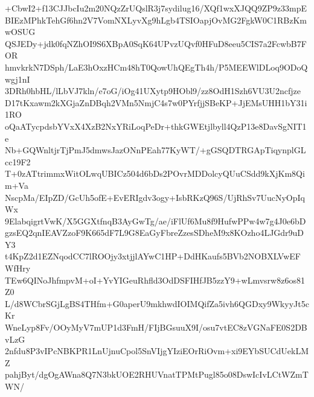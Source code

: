 +CbwI2+f13CJJbcIu2m20NQzZrUQslR3j7sydilug16/XQf1wxXJQQ9ZP9z33mpE
BIEzMPhkTehGf6hn2V7VomNXLyvXg9hLgb4TSIOapjOvMG2FgkW0C1RBzKmwOSUG
QSJEDy+jdk0fqNZhOI9S6XBpA0SqK64UPvzUQvf0HFuD8eeu5CIS7a2FcwbB7FOR
hmvkrkN7DSph/LaE3hOxzHCm48hT0QowUhQEgTh4h/P5MEEWlDLoq9ODoQwgj1nI
3DRh0hbHL/lLbVJ7kln/e7oG/iOg41UXytp9HObl9/zz8OdH1Szh6VU3U2ncfjze
D17tKxawm2kXGjaZnDBqh2VMn5NmjC4s7w0PYrfjjSBeKP+JjEMsUHH1bY31i1RO
oQaATycpdsbYVxX4XzB2NxYRiLoqPeDr+thkGWEtjlbyll4QzP13e8DavSgNIT1e
Nb+GQWnltjrTjPmJ5dmwsJazONnPEah77KyWT/+gGSQDTRGApTiqynplGLcc19F2
T+0zATtrimmxWitOLwqUBICz504d6bDs2POvrMDDolcyQUuCSdd9kXjKm8Qim+Va
NscpMa/EIpZD/GcUh5ofE+EvERIgdv3ogy+IsbRKzQ96S/UjRhSv7UucNyOpIqWx
9ElabqigrtVwK/X5GGXtfnqB3AyGwTg/ae/iFlUf6Mu8f9HufwPPw4w7g4J0e6bD
gzsEQ2qnIEAVZzoF9K665dF7L9G8EaGyFbreZzesSDheM9x8KOzho4LJGdr9uDY3
t4KpZ2d1EZNqodCC7lROOjy3xtjjlAYwC1HP+DdHKaufs5BVb2NOBXLVwEFWfHry
TEw6QINoJhfmpvM+oI+YvYIGeuRhfld3OdDSFIHfJB5zzY9+wLmvsrw8z6os81Z0
L/d8WCbrSGjLgBS4THfm+G0aperU9mkhwdIOIMQifZa5ivh6QGDxy9WkyyJt5cKr
WneLyp8Fv/OOyMyV7mUP1d3FmH/FIjBGsuuX9I/osu7vtEC8zVGNaFE0S2DBvLzG
2nfdu8P3vIPcNBKPR1LnUjnuCpol5SnVIjgYIziEOrRiOvm+xi9EYbSUCdUekLMZ
pahjByt/dgOgAWna8Q7N3bkUOE2RHUVnatTPMtPugl85o08DswIcIvLCtWZmTWN/
